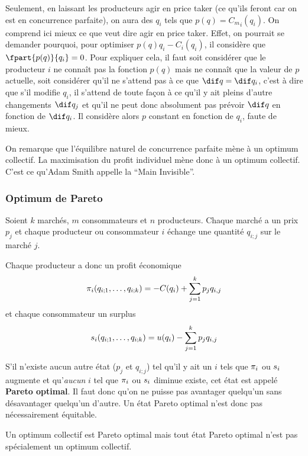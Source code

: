 Seulement, en laissant les producteurs agir en price taker
(ce qu'ils feront car on est en concurrence parfaite),
on aura des $q_i$ tels que $p(q) = {C_m}_i(q_i)$.
On comprend ici mieux ce que veut dire agir en price taker.
Effet, on pourrait se demander pourquoi, pour optimiser
$p(q)q_i - {C}_i(q_i)$, il considère que $\fpart{p(q)}{q_i} = 0$.
Pour expliquer cela,
il faut soit considérer que le producteur $i$ ne connaît pas la fonction $p(q)$
mais ne connaît que la valeur de $p$ actuelle, soit considérer qu'il
ne s'attend pas à ce que $\dif q = \dif q_i$, c'est à dire que s'il modifie
$q_i$, il s'attend de toute façon à ce qu'il y ait pleins d'autre changements
$\dif q_j$ et qu'il ne peut donc absolument pas prévoir $\dif q$ en fonction
de $\dif q_i$. Il considère alors $p$ constant en fonction de $q_i$,
faute de mieux.

On remarque que l'équilibre naturel de concurrence parfaite mène à
un optimum collectif.
La maximisation du profit individuel mène donc à un optimum collectif.
C'est ce qu'Adam Smith appelle la ``Main Invisible''.

\subsubsection{Optimum de Pareto}
Soient $k$ marchés, $m$ consommateurs et $n$ producteurs.
Chaque marché a un prix $p_j$ et chaque producteur ou consommateur $i$
échange une quantité $q_{i;j}$ sur le marché $j$.

Chaque producteur a donc un profit économique
\[ \pi_i(q_{i;1},\ldots,q_{i;k}) = -C(q_i) + \sum_{j=1}^k p_jq_{i,j} \]
et chaque consommateur un surplus
\[ s_i(q_{i;1},\ldots,q_{i;k}) = u(q_i) - \sum_{j=1}^k p_jq_{i,j} \]

S'il n'existe aucun autre état ($p_j$ et $q_{i;j}$)
tel qu'il y ait un $i$ tels que $\pi_i$ ou $s_i$ augmente et
qu'\emph{aucun} $i$ tel que $\pi_i$ ou $s_i$ diminue existe,
cet état est appelé \textbf{Pareto optimal}.
Il faut donc qu'on ne puisse pas avantager quelqu'un sans désavantager
quelqu'un d'autre.
Un état Pareto optimal n'est donc pas nécessairement équitable.

Un optimum collectif est Pareto optimal mais tout état Pareto optimal
n'est pas spécialement un optimum collectif.

